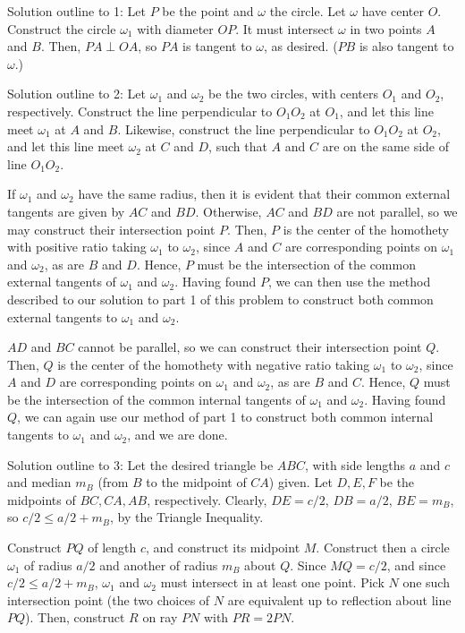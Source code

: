 \begin{mdsoln}
    Solution outline to 1:
Let $P$ be the point and $\omega$ the circle. Let $\omega$ have center $O$. Construct the circle $\omega_1$ with diameter $OP$. It must intersect $\omega$ in two points $A$ and $B$. Then, $PA\perp OA$, so $PA$ is tangent to $\omega$, as desired. ($PB$ is also tangent to $\omega$.)

Solution outline to 2:
Let $\omega_1$ and $\omega_2$ be the two circles, with centers $O_1$ and $O_2$, respectively. Construct the line perpendicular to $O_1O_2$ at $O_1$, and let this line meet $\omega_1$ at $A$ and $B$. Likewise, construct the line perpendicular to $O_1O_2$ at $O_2$, and let this line meet $\omega_2$ at $C$ and $D$, such that $A$ and $C$ are on the same side of line $O_1O_2$.

If $\omega_1$ and $\omega_2$ have the same radius, then it is evident that their common external tangents are given by $AC$ and $BD$. Otherwise, $AC$ and $BD$ are not parallel, so we may construct their intersection point $P$. Then, $P$ is the center of the homothety with positive ratio taking $\omega_1$ to $\omega_2$, since $A$ and $C$ are corresponding points on $\omega_1$ and $\omega_2$, as are $B$ and $D$. Hence, $P$ must be the intersection of the common external tangents of $\omega_1$ and $\omega_2$. Having found $P$, we can then use the method described to our solution to part 1 of this problem to construct both common external tangents to $\omega_1$ and $\omega_2$.

$AD$ and $BC$ cannot be parallel, so we can construct their intersection point $Q$. Then, $Q$ is the center of the homothety with negative ratio taking $\omega_1$ to $\omega_2$, since $A$ and $D$ are corresponding points on $\omega_1$ and $\omega_2$, as are $B$ and $C$. Hence, $Q$ must be the intersection of the common internal tangents of $\omega_1$ and $\omega_2$. Having found $Q$, we can again use our method of part 1 to construct both common internal tangents to $\omega_1$ and $\omega_2$, and we are done.

Solution outline to 3:
Let the desired triangle be $ABC$, with side lengths $a$ and $c$ and median $m_B$ (from $B$ to the midpoint of $CA$) given. Let $D,E,F$ be the midpoints of $BC,CA,AB$, respectively. Clearly, $DE = c/2$, $DB = a/2$, $BE = m_B$, so $c/2\le a/2 + m_B$, by the Triangle Inequality.

Construct $PQ$ of length $c$, and construct its midpoint $M$. Construct then a circle $\omega_1$ of radius $a/2$ and another of radius $m_B$ about $Q$. Since $MQ = c/2$, and since $c/2\le a/2 + m_B$, $\omega_1$ and $\omega_2$ must intersect in at least one point. Pick $N$ one such intersection point (the two choices of $N$ are equivalent up to reflection about line $PQ$). Then, construct $R$ on ray $PN$ with $PR = 2PN$.


\end{mdsoln}
